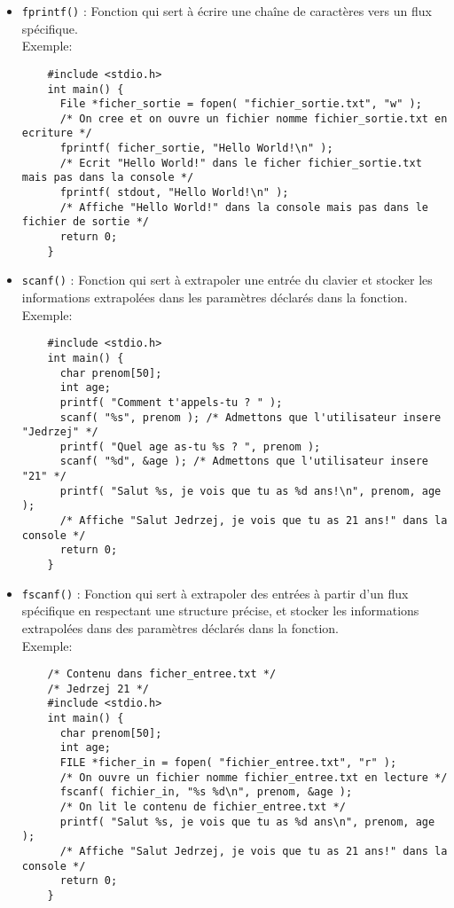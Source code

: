 \documentclass[10pt]{article}
\begin{document}
\begin{itemize}
\item \texttt{fprintf()} : Fonction qui sert à écrire une chaîne de caractères vers un flux spécifique.\\
  Exemple:
  \begin{lstlisting}
    #include <stdio.h>
    int main() {
      File *ficher_sortie = fopen( "fichier_sortie.txt", "w" );
      /* On cree et on ouvre un fichier nomme fichier_sortie.txt en ecriture */
      fprintf( ficher_sortie, "Hello World!\n" );
      /* Ecrit "Hello World!" dans le ficher fichier_sortie.txt mais pas dans la console */
      fprintf( stdout, "Hello World!\n" );
      /* Affiche "Hello World!" dans la console mais pas dans le fichier de sortie */
      return 0;
    }
  \end{lstlisting}

\item \texttt{scanf()} : Fonction qui sert à extrapoler une entrée du clavier et stocker les informations extrapolées dans les paramètres déclarés dans la fonction.\\
  Exemple:
  \begin{lstlisting}
    #include <stdio.h>
    int main() {
      char prenom[50];
      int age;
      printf( "Comment t'appels-tu ? " );
      scanf( "%s", prenom ); /* Admettons que l'utilisateur insere "Jedrzej" */
      printf( "Quel age as-tu %s ? ", prenom );
      scanf( "%d", &age ); /* Admettons que l'utilisateur insere "21" */
      printf( "Salut %s, je vois que tu as %d ans!\n", prenom, age );
      /* Affiche "Salut Jedrzej, je vois que tu as 21 ans!" dans la console */
      return 0;
    }
  \end{lstlisting}
  
\item \texttt{fscanf()} : Fonction qui sert à extrapoler des entrées à partir d'un flux spécifique en respectant une structure précise, et stocker les informations extrapolées dans des paramètres déclarés dans la fonction.\\
  Exemple:
  \begin{lstlisting}
    /* Contenu dans ficher_entree.txt */
    /* Jedrzej 21 */
    #include <stdio.h>
    int main() {
      char prenom[50];
      int age;
      FILE *ficher_in = fopen( "fichier_entree.txt", "r" );
      /* On ouvre un fichier nomme fichier_entree.txt en lecture */
      fscanf( fichier_in, "%s %d\n", prenom, &age );
      /* On lit le contenu de fichier_entree.txt */
      printf( "Salut %s, je vois que tu as %d ans\n", prenom, age );
      /* Affiche "Salut Jedrzej, je vois que tu as 21 ans!" dans la console */
      return 0;
    }
  \end{lstlisting}
  

\end{itemize}
\end{document}
